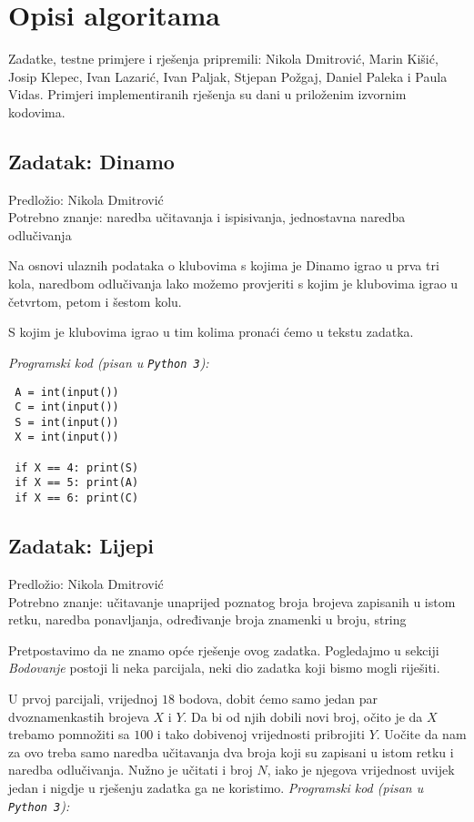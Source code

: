 \documentclass[a4paper]{article}
\begin{document}
\section*{Opisi algoritama}
Zadatke, testne primjere i rješenja pripremili: Nikola Dmitrović, Marin Kišić,
Josip Klepec, Ivan Lazarić, Ivan Paljak, Stjepan Požgaj, Daniel Paleka i
Paula Vidas. Primjeri implementiranih rješenja su dani u priloženim izvornim
kodovima.

\subsection*{Zadatak: Dinamo}
\textsf{Predložio: Nikola Dmitrović}\\
\textsf{Potrebno znanje: naredba učitavanja i ispisivanja, jednostavna naredba
odlučivanja}

Na osnovi ulaznih podataka o klubovima s kojima je Dinamo igrao u prva tri kola,
naredbom odlučivanja lako možemo provjeriti s kojim je klubovima igrao u
četvrtom, petom i šestom kolu.

S kojim je klubovima igrao u tim kolima pronaći ćemo u tekstu zadatka.

\textit{Programski kod (pisan u \texttt{Python 3}):}

\vspace{-2ex}
\begin{verbatim}
 A = int(input())
 C = int(input())
 S = int(input())
 X = int(input())

 if X == 4: print(S)
 if X == 5: print(A)
 if X == 6: print(C)
\end{verbatim}

\subsection*{Zadatak: Lijepi}
\textsf{Predložio: Nikola Dmitrović}\\
\textsf{Potrebno znanje: učitavanje unaprijed poznatog broja brojeva zapisanih
u istom retku, naredba ponavljanja, određivanje broja znamenki u broju, string}

Pretpostavimo da ne znamo opće rješenje ovog zadatka. Pogledajmo u sekciji
\textit{Bodovanje} postoji li neka parcijala, neki dio zadatka koji bismo mogli
riješiti.

U prvoj parcijali, vrijednoj $18$ bodova, dobit ćemo samo jedan par
dvoznamenkastih brojeva $X$ i $Y$. Da bi od njih dobili novi broj, očito je da
$X$ trebamo pomnožiti sa $100$ i tako dobivenoj vrijednosti pribrojiti $Y$.
Uočite da nam za ovo treba samo naredba učitavanja dva broja koji su zapisani u
istom retku i naredba odlučivanja. Nužno je učitati i broj $N$, iako je njegova
vrijednost uvijek jedan i nigdje u rješenju zadatka ga ne koristimo.
\textit{Programski kod (pisan u \texttt{Python 3}):}
\end{document}
